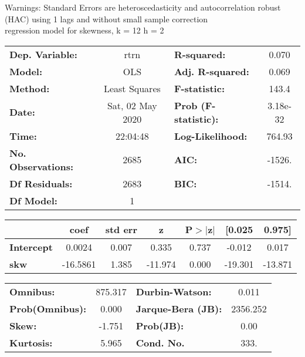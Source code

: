Warnings: \newline
 [1] Standard Errors are heteroscedasticity and autocorrelation robust (HAC) using 1 lags and without small sample correction\\ 

regression model for skewness, k = 12 h = 2\begin{center}
\begin{tabular}{lclc}
\toprule
\textbf{Dep. Variable:}    &       rtrn       & \textbf{  R-squared:         } &     0.070   \\
\textbf{Model:}            &       OLS        & \textbf{  Adj. R-squared:    } &     0.069   \\
\textbf{Method:}           &  Least Squares   & \textbf{  F-statistic:       } &     143.4   \\
\textbf{Date:}             & Sat, 02 May 2020 & \textbf{  Prob (F-statistic):} &  3.18e-32   \\
\textbf{Time:}             &     22:04:48     & \textbf{  Log-Likelihood:    } &    764.93   \\
\textbf{No. Observations:} &        2685      & \textbf{  AIC:               } &    -1526.   \\
\textbf{Df Residuals:}     &        2683      & \textbf{  BIC:               } &    -1514.   \\
\textbf{Df Model:}         &           1      & \textbf{                     } &             \\
\bottomrule
\end{tabular}
\begin{tabular}{lcccccc}
                   & \textbf{coef} & \textbf{std err} & \textbf{z} & \textbf{P$> |$z$|$} & \textbf{[0.025} & \textbf{0.975]}  \\
\midrule
\textbf{Intercept} &       0.0024  &        0.007     &     0.335  &         0.737        &       -0.012    &        0.017     \\
\textbf{skw}       &     -16.5861  &        1.385     &   -11.974  &         0.000        &      -19.301    &      -13.871     \\
\bottomrule
\end{tabular}
\begin{tabular}{lclc}
\textbf{Omnibus:}       & 875.317 & \textbf{  Durbin-Watson:     } &    0.011  \\
\textbf{Prob(Omnibus):} &   0.000 & \textbf{  Jarque-Bera (JB):  } & 2356.252  \\
\textbf{Skew:}          &  -1.751 & \textbf{  Prob(JB):          } &     0.00  \\
\textbf{Kurtosis:}      &   5.965 & \textbf{  Cond. No.          } &     333.  \\
\bottomrule
\end{tabular}
\end{center}

